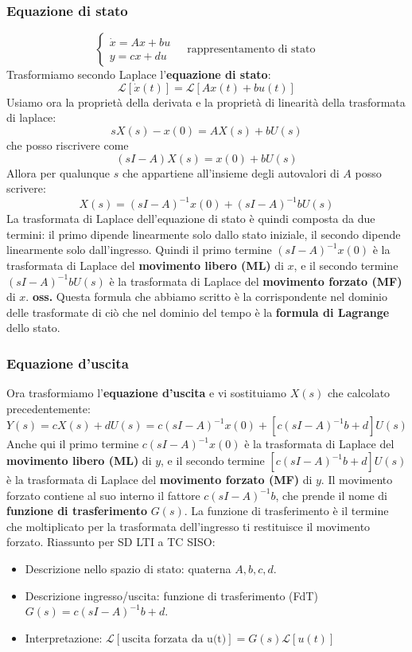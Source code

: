 \subsubsection{Equazione di stato}
\[
    \begin{cases}
        \dot{x} = Ax + bu\\
        y = cx + du
    \end{cases} \;\;\;\; \text{rappresentamento di stato}\;
\]
\newline
Trasformiamo secondo Laplace l'\textbf{equazione di stato}:
\[
    \mathcal{L}[\dot{x}(t)] = \mathcal{L}[Ax(t) + bu(t)]
\]
Usiamo ora la proprietà della derivata e la proprietà di linearità della trasformata di laplace:
\[
    sX(s)-x(0) = AX(s) + bU(s)
\]
che posso riscrivere come
\[
    (sI-A)X(s) = x(0) + bU(s)
\]
Allora per qualunque $s$ che appartiene all'insieme degli autovalori di $A$ posso scrivere:
\[
    X(s) = (sI-A)^{-1} x(0) + (sI-A)^{-1} bU(s)
\]
La trasformata di Laplace dell'equazione di stato è quindi composta da due termini: il primo dipende linearmente solo dallo stato iniziale, il secondo dipende linearmente solo dall'ingresso.\newline
Quindi il primo termine $(sI-A)^{-1} x(0)$ è la trasformata di Laplace del \textbf{movimento libero (ML)} di $x$, e il secondo termine $(sI-A)^{-1} bU(s)$ è la trasformata di Laplace del \textbf{movimento forzato (MF)} di $x$.\newline
\newline
\textbf{oss.} Questa formula che abbiamo scritto è la corrispondente nel dominio delle trasformate di ciò che nel dominio del tempo è la \textbf{formula di Lagrange} dello stato.
\subsubsection{Equazione d'uscita}
Ora trasformiamo l'\textbf{equazione d'uscita} e vi sostituiamo $X(s)$ che calcolato precedentemente:
\[
    Y(s) = cX(s) + dU(s) = c(sI-A)^{-1} x(0) + [c(sI-A)^{-1} b + d]U(s)
\]
Anche qui il primo termine $c(sI-A)^{-1} x(0)$ è la trasformata di Laplace del \textbf{movimento libero (ML)} di $y$, e il secondo termine $[c(sI-A)^{-1} b + d]U(s)$ è la trasformata di Laplace del \textbf{movimento forzato (MF)} di $y$.\newline
\newline
Il movimento forzato contiene al suo interno il fattore $c(sI-A)^{-1} b$, che prende il nome di \textbf{funzione di trasferimento} $G(s)$. La funzione di trasferimento è il termine che moltiplicato per la trasformata dell'ingresso ti restituisce il movimento forzato.\newline
\newline
\newline
Riassunto per SD LTI a TC SISO:
\begin{itemize}
    \item Descrizione nello spazio di stato: quaterna $A, b, c, d$.
    \item Descrizione ingresso/uscita: funzione di trasferimento (FdT) $G(s) = c(sI-A)^{-1}b +d$.
    \item Interpretazione: $\mathcal{L}[\text{uscita forzata da u(t)}]= G(s) \mathcal{L}[u(t)]$ 
\end{itemize}
